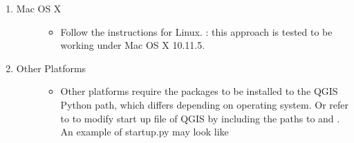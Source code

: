\documentclass[letterpaper,10pt,english]{sphinxmanual}
\begin{document}
\begin{itemize}
\begin{enumerate}
\begin{description}
\begin{quote}
\begin{quote}
%
\begin{sphinxVerbatim}[commandchars=\\\{\}]
  
  
\end{sphinxVerbatim}

\begin{figure}[htbp]
\centering
\capstart

\noindent{}
\caption{}\label{\detokenize{Getting_Started:id2}}\end{figure}
\end{quote}
\end{quote}

\end{description}

\item {} \begin{description}
\item[{Mac OS X}] \leavevmode\begin{itemize}
\item {} 
Follow the instructions for Linux. : this approach is tested to be working under Mac OS X 10.11.5.

\end{itemize}

\end{description}

\item {} \begin{description}
\item[{Other Platforms}] \leavevmode\begin{itemize}
\item {} 
Other platforms require the packages to be installed to the QGIS Python path, which differs depending on operating system.
Or refer to 
to modify start up file of QGIS by including the paths to  and . An example of startup.py may look like

%
\begin{sphinxVerbatim}[commandchars=\\\{\}]
 
\end{sphinxVerbatim}

\end{itemize}

\end{description}

\end{enumerate}

\end{itemize}
\end{document}
